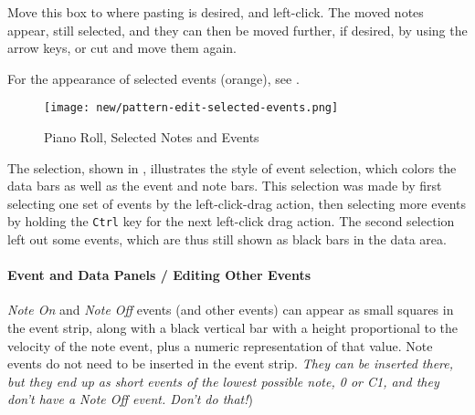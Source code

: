    Move this box to where pasting is
   desired, and left-click.  The moved notes appear, still selected,
   and they can then be moved further, if desired, by using the arrow keys, or
   cut and move them again.

   For the appearance of selected events (orange), see
   .

\begin{figure}[H]
   \centering 
   \texttt{[image: new/pattern-edit-selected-events.png]}
   \caption{Piano Roll, Selected Notes and Events}
   \label{fig:pattern_editor_selected_events}
\end{figure}

   The selection, shown in
   ,
   illustrates the style of event selection, which colors the data
   bars as well as the event and note bars.  This selection was made by first
   selecting one set of events by the
   left-click-drag action, then
   selecting more events by holding the \texttt{Ctrl}
   key for the next left-click drag action.
   The second selection left out some events, which are thus still
   shown as black bars in the data area.

   
\paragraph{Event and Data Panels / Editing Other Events}
\label{paragraph:pattern_editor_other_events}


   \textsl{Note On} and \textsl{Note Off} events (and other events) can appear
   as small squares in the event strip, along with a black vertical bar with a
   height proportional to the velocity of the note event, plus a numeric
   representation of that value.
   Note events do not need to be inserted in the event strip.
   \textsl{They can be inserted there, but they end up as short
   events of the lowest possible note, 0 or C1, and they don't have a Note
   Off event.  Don't do that!})


